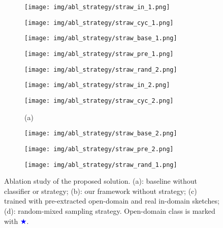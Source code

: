 \documentclass[10pt,twocolumn,letterpaper]{article}
\begin{document}
\begin{figure}[tbp]
\begin{center}
  \begin{subfigure}[b]{\strwidth\linewidth}
  \texttt{[image: img/abl\_strategy/straw\_in\_1.png]}
  \end{subfigure}
  \begin{subfigure}[b]{\strwidth\linewidth}
  \texttt{[image: img/abl\_strategy/straw\_cyc\_1.png]}
  \end{subfigure}
  \begin{subfigure}[b]{\strwidth\linewidth}
  \texttt{[image: img/abl\_strategy/straw\_base\_1.png]}
  \end{subfigure}
  \begin{subfigure}[b]{\strwidth\linewidth}
  \texttt{[image: img/abl\_strategy/straw\_pre\_1.png]}
  \end{subfigure}
\begin{subfigure}[b]{\strwidth\linewidth}
  \texttt{[image: img/abl\_strategy/straw\_rand\_2.png]}
  \end{subfigure}
  
  \begin{subfigure}[b]{\strwidth\linewidth}
  \texttt{[image: img/abl\_strategy/straw\_in\_2.png]}
  \end{subfigure}
   \begin{subfigure}[b]{\strwidth\linewidth}
  \texttt{[image: img/abl\_strategy/straw\_cyc\_2.png]}
  \caption{(a)}
  \end{subfigure} 
  \begin{subfigure}[b]{\strwidth\linewidth}
  \texttt{[image: img/abl\_strategy/straw\_base\_2.png]}
  \end{subfigure}
   \begin{subfigure}[b]{\strwidth\linewidth}
  \texttt{[image: img/abl\_strategy/straw\_pre\_2.png]}
  \end{subfigure}
\begin{subfigure}[b]{\strwidth\linewidth}
  \texttt{[image: img/abl\_strategy/straw\_rand\_1.png]}
  \end{subfigure}
\end{center}
\caption{Ablation study of the proposed solution. (a): baseline without classifier or strategy; (b): our framework without strategy; (c) trained with pre-extracted open-domain and real in-domain sketches; (d): random-mixed sampling strategy. Open-domain class is marked with \textcolor{blue}{$\bigstar$}.}
 \label{fig:abl_strategy}
\end{figure}
\end{document}
